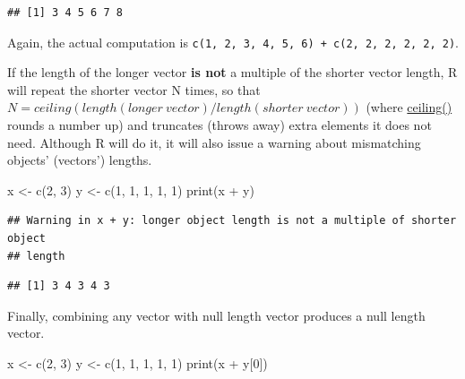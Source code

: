 \documentclass[
]{book}
\newenvironment{Shaded}{\begin{snugshade}}{\end{snugshade}}
\newcommand{\DecValTok}[1]{\textcolor[rgb]{0.00,0.00,0.81}{#1}}
\newcommand{\FunctionTok}[1]{\textcolor[rgb]{0.00,0.00,0.00}{#1}}
\newcommand{\NormalTok}[1]{#1}
\newcommand{\OtherTok}[1]{\textcolor[rgb]{0.56,0.35,0.01}{#1}}
\newcommand{\SpecialCharTok}[1]{\textcolor[rgb]{0.00,0.00,0.00}{#1}}
\begin{document}
\begin{verbatim}
## [1] 3 4 5 6 7 8
\end{verbatim}

Again, the actual computation is \texttt{c(1,\ 2,\ 3,\ 4,\ 5,\ 6)\ +\ c(2,\ 2,\ 2,\ 2,\ 2,\ 2)}.

If the length of the longer vector \textbf{is not} a multiple of the shorter vector length, R will repeat the shorter vector N times, so that \(N = ceiling(length(longer~vector) / length(shorter~vector))\) (where \href{https://www.rdocumentation.org/packages/base/versions/3.6.2/topics/Round}{ceiling()} rounds a number up) and truncates (throws away) extra elements it does not need. Although R will do it, it will also issue a warning about mismatching objects' (vectors') lengths.

\begin{Shaded}
\begin{Highlighting}[]
\NormalTok{x }\OtherTok{\textless{}{-}} \FunctionTok{c}\NormalTok{(}\DecValTok{2}\NormalTok{, }\DecValTok{3}\NormalTok{)}
\NormalTok{y }\OtherTok{\textless{}{-}} \FunctionTok{c}\NormalTok{(}\DecValTok{1}\NormalTok{, }\DecValTok{1}\NormalTok{, }\DecValTok{1}\NormalTok{, }\DecValTok{1}\NormalTok{, }\DecValTok{1}\NormalTok{)}
\FunctionTok{print}\NormalTok{(x }\SpecialCharTok{+}\NormalTok{ y)}
\end{Highlighting}
\end{Shaded}

\begin{verbatim}
## Warning in x + y: longer object length is not a multiple of shorter object
## length
\end{verbatim}

\begin{verbatim}
## [1] 3 4 3 4 3
\end{verbatim}

Finally, combining any vector with null length vector produces a null length vector.

\begin{Shaded}
\begin{Highlighting}[]
\NormalTok{x }\OtherTok{\textless{}{-}} \FunctionTok{c}\NormalTok{(}\DecValTok{2}\NormalTok{, }\DecValTok{3}\NormalTok{)}
\NormalTok{y }\OtherTok{\textless{}{-}} \FunctionTok{c}\NormalTok{(}\DecValTok{1}\NormalTok{, }\DecValTok{1}\NormalTok{, }\DecValTok{1}\NormalTok{, }\DecValTok{1}\NormalTok{, }\DecValTok{1}\NormalTok{)}
\FunctionTok{print}\NormalTok{(x }\SpecialCharTok{+}\NormalTok{ y[}\DecValTok{0}\NormalTok{])}
\end{Highlighting}
\end{Shaded}
\end{document}
